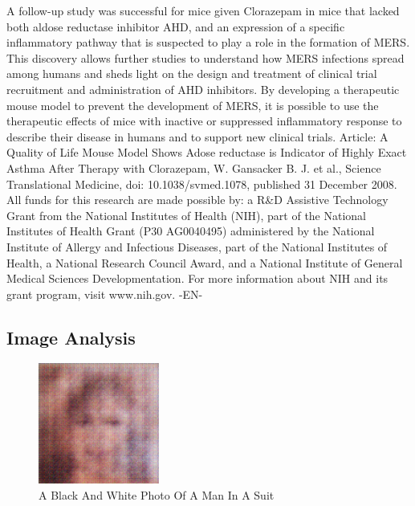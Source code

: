 \documentclass{article}%
\begin{document}
A follow{-}up study was successful for mice given Clorazepam in mice that lacked both aldose reductase inhibitor AHD, and an expression of a specific inflammatory pathway that is suspected to play a role in the formation of MERS. This discovery allows further studies to understand how MERS infections spread among humans and sheds light on the design and treatment of clinical trial recruitment and administration of AHD inhibitors.\newline%
By developing a therapeutic mouse model to prevent the development of MERS, it is possible to use the therapeutic effects of mice with inactive or suppressed inflammatory response to describe their disease in humans and to support new clinical trials.\newline%
Article: A Quality of Life Mouse Model Shows Adose reductase is Indicator of Highly Exact Asthma After Therapy with Clorazepam, W. Gansacker B. J. et al., Science Translational Medicine, doi: 10.1038/svmed.1078, published 31 December 2008.\newline%
All funds for this research are made possible by: a R\&D Assistive Technology Grant from the National Institutes of Health (NIH), part of the National Institutes of Health Grant (P30 AG0040495) administered by the National Institute of Allergy and Infectious Diseases, part of the National Institutes of Health, a National Research Council Award, and a National Institute of General Medical Sciences Developmentation. For more information about NIH and its grant program, visit www.nih.gov.\newline%
{-}EN{-}

%
\subsection{Image Analysis}%
\label{subsec:ImageAnalysis}%


\begin{figure}[h!]%
\centering%
\includegraphics[width=150px]{500_fake_images/samples_5_437.png}%
\caption{A Black And White Photo Of A Man In A Suit}%
\end{figure}

%
\end{document}

